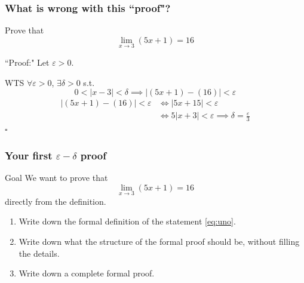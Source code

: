 \documentclass[14pt]{beamer}
\begin{document}
	\begin{frame}
		\frametitle{What is wrong with this ``proof"?}
		\fontsize{13}{13}\selectfont
		\vspace{-2mm}
		\begin{block}{}%
			Prove that
			\[
				\lim_{x\to 3}(5x+1) = 16
			\]
		\end{block}

		\begin{block}{``Proof:"}
			Let $\varepsilon>0$.

			WTS $\forall \varepsilon>0$, $\exists\delta>0$ s.t.
			\[
				0<|x-3|<\delta \implies |(5x+1) - (16)|<\varepsilon
			\]
			\vspace{-3mm}
			\begin{align*}
				|(5x+1) - (16)|<\varepsilon & \iff |5x+15|<\varepsilon                                     \\
				                            & \iff 5|x+3|<\varepsilon \implies\delta=\frac{\varepsilon}{3}
			\end{align*}
			\hfill $\square$
		\end{block}
	\end{frame}


	\begin{frame}[t]
		\frametitle{Your first $\varepsilon-\delta$ proof}

		\begin{block}{Goal}
			We want to prove that
			\begin{equation}
				\label{eq:uno}\lim_{x \to 3}\left( 5x + 1 \right) = 16
			\end{equation}
			directly from the definition.
		\end{block}
		\vfill
		\begin{enumerate}

			\item Write down the formal definition of the statement \eqref{eq:uno}.

			\item Write down what the structure of the formal proof should be, without
				filling the details.

			\item Write down a complete formal proof.
		\end{enumerate}
		\vfill
	\end{frame}
\end{document}

